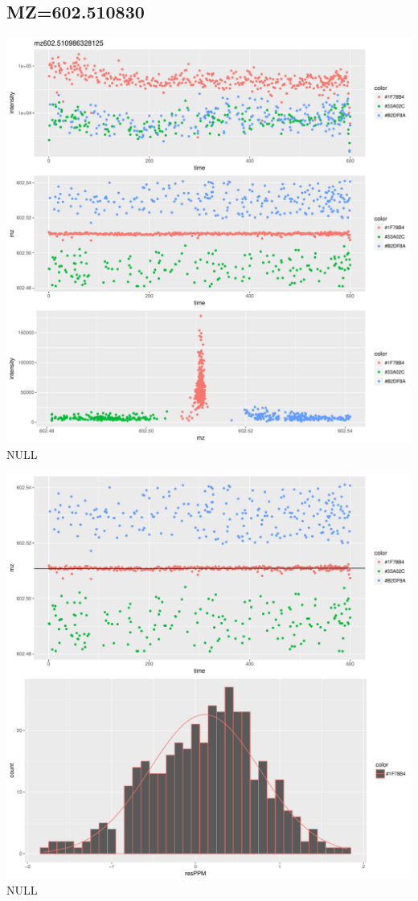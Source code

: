 \documentclass[]{article}
\begin{document}
\subsection{MZ=602.510830}\label{mz602.510830}

\includegraphics{Supplementary_document_files/figure-latex/cluster.mz.602-1.pdf}
NULL

\includegraphics{Supplementary_document_files/figure-latex/filter.lm.602-1.pdf}
NULL
\end{document}

